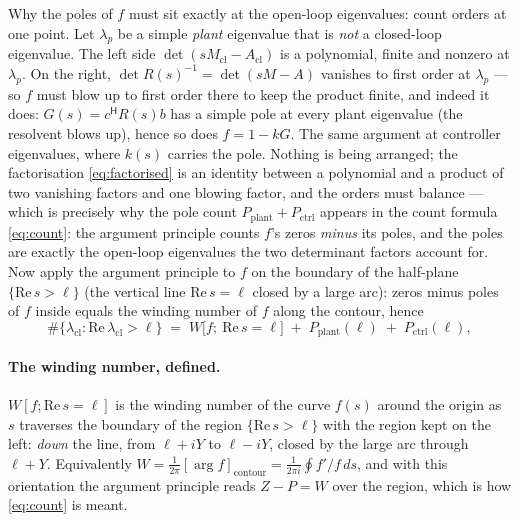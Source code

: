 \documentclass[11pt,a4paper]{article}
\newcommand{\Mcl}{M_{\mathrm{cl}}}
\newcommand{\Acl}{A_{\mathrm{cl}}}
\newcommand{\hp}{^{\mathsf H}}
\begin{document}
{Why the poles of $f$ must sit exactly at the open-loop eigenvalues: count orders at one
point.  Let $\lambda_p$ be a simple \emph{plant} eigenvalue
that is \emph{not} a closed-loop eigenvalue.  The left side $\det(s\Mcl-\Acl)$ is a
polynomial, finite and nonzero at $\lambda_p$.  On the right, $\det R(s)^{-1}=\det(sM-A)$
vanishes to first order at $\lambda_p$ --- so $f$ must blow up to first order there to
keep the product finite, and indeed it does: $G(s)=c\hp R(s)b$ has a simple pole at every
plant eigenvalue (the resolvent blows up), hence so does $f=1-kG$.  The same argument at
controller eigenvalues, where $k(s)$ carries the pole.  Nothing is being arranged; the
factorisation \eqref{eq:factorised} is an identity between a polynomial and a product of
two vanishing factors and one blowing factor, and the orders must balance --- which is
precisely why the pole count $P_{\mathrm{plant}}+P_{\mathrm{ctrl}}$ appears in the count
formula \eqref{eq:count}: the argument principle counts $f$'s zeros \emph{minus} its
poles, and the poles are exactly the open-loop eigenvalues the two determinant factors
account for.  Now apply the argument principle to $f$ on the boundary of the half-plane
$\{\mathrm{Re}\,s>\ell\}$ (the vertical line $\mathrm{Re}\,s=\ell$ closed by a large arc):
zeros minus poles of $f$ inside equals the winding number of $f$ along the contour, hence
\begin{equation}
\boxed{\;
\#\{\lambda_{\mathrm{cl}}:\mathrm{Re}\,\lambda_{\mathrm{cl}}>\ell\}
\;=\; W\bigl[f;\ \mathrm{Re}\,s=\ell\bigr] \;+\; P_{\mathrm{plant}}(\ell)
\;+\; P_{\mathrm{ctrl}}(\ell),
\;}
\label{eq:count}
\end{equation}



\paragraph{The winding number, defined.}
\label{sec:winding-num}
$W[f;\mathrm{Re}\,s=\ell]$ is the winding number of the curve $f(s)$ around the origin as
$s$ traverses the boundary of the region $\{\mathrm{Re}\,s>\ell\}$ with the region kept on
the left: \emph{down} the line, from $\ell+iY$ to $\ell-iY$, closed by the large arc
through $\ell+Y$.  Equivalently
$W=\tfrac1{2\pi}[\arg f]_{\mathrm{contour}}=\tfrac1{2\pi i}\oint f'/f\,ds$, and with this
orientation the argument principle reads $Z-P=W$ over the region, which is how
\eqref{eq:count} is meant.

}
\end{document}
